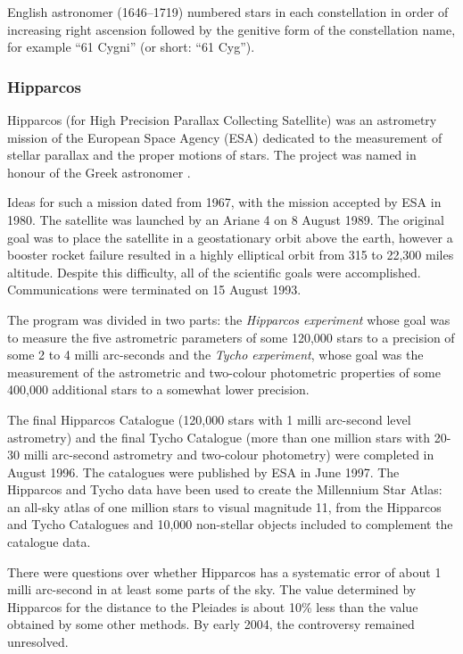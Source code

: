 English astronomer  (1646--1719) numbered stars in each
constellation in order of increasing right ascension followed by the genitive
form of the constellation name, for example ``61 Cygni'' (or short: ``61 Cyg'').

\subsubsection{Hipparcos}
\label{sec:Phenomena:StarNames:Hipparcos}

Hipparcos (for High Precision Parallax Collecting Satellite) was an
astrometry mission of the European Space Agency (ESA) dedicated to the
measurement of stellar parallax and the proper motions of stars. The
project was named in honour of the Greek astronomer .

Ideas for such a mission dated from 1967, with the mission accepted by
ESA in 1980. The satellite was launched by an Ariane 4 on 8 August 1989.
The original goal was to place the satellite in a geostationary orbit
above the earth, however a booster rocket failure resulted in a highly
elliptical orbit from 315 to 22,300 miles altitude. Despite this
difficulty, all of the scientific goals were accomplished.
Communications were terminated on 15 August 1993.

The program was divided in two parts: the \emph{Hipparcos experiment}
whose goal was to measure the five astrometric parameters of some
120,000 stars to a precision of some 2 to 4 milli arc-seconds and the
\emph{Tycho experiment}, whose goal was the measurement of the
astrometric and two-colour photometric properties of some 400,000
additional stars to a somewhat lower precision.

The final Hipparcos Catalogue (120,000 stars with 1 milli arc-second
level astrometry) and the final Tycho Catalogue (more than one million
stars with 20-30 milli arc-second astrometry and two-colour photometry)
were completed in August 1996. The catalogues were published by ESA in
June 1997. The Hipparcos and Tycho data have been used to create the
Millennium Star Atlas: an all-sky atlas of one million stars to visual
magnitude 11, from the Hipparcos and Tycho Catalogues and 10,000
non-stellar objects included to complement the catalogue data.

There were questions over whether Hipparcos has a systematic error of
about 1 milli arc-second in at least some parts of the sky. The value
determined by Hipparcos for the distance to the Pleiades is about 10\%
less than the value obtained by some other methods. By early 2004, the
controversy remained unresolved.

